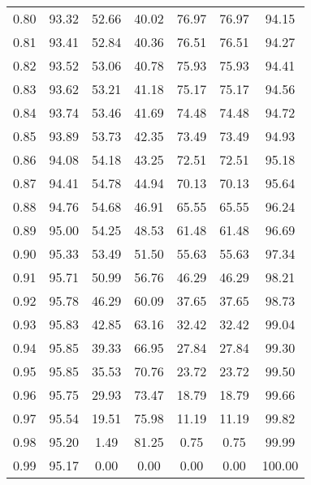 \begin{tabular}{|c|c|c|c|c|c|c|}
      0.80 &     93.32 &     52.66 &      40.02 &   76.97 &      76.97 &         94.15 \\
      0.81 &     93.41 &     52.84 &      40.36 &   76.51 &      76.51 &         94.27 \\
      0.82 &     93.52 &     53.06 &      40.78 &   75.93 &      75.93 &         94.41 \\
      0.83 &     93.62 &     53.21 &      41.18 &   75.17 &      75.17 &         94.56 \\
      0.84 &     93.74 &     53.46 &      41.69 &   74.48 &      74.48 &         94.72 \\
      0.85 &     93.89 &     53.73 &      42.35 &   73.49 &      73.49 &         94.93 \\
      0.86 &     94.08 &     54.18 &      43.25 &   72.51 &      72.51 &         95.18 \\
      0.87 &     94.41 &     54.78 &      44.94 &   70.13 &      70.13 &         95.64 \\
      0.88 &     94.76 &     54.68 &      46.91 &   65.55 &      65.55 &         96.24 \\
      0.89 &     95.00 &     54.25 &      48.53 &   61.48 &      61.48 &         96.69 \\
      0.90 &     95.33 &     53.49 &      51.50 &   55.63 &      55.63 &         97.34 \\
      0.91 &     95.71 &     50.99 &      56.76 &   46.29 &      46.29 &         98.21 \\
      0.92 &     95.78 &     46.29 &      60.09 &   37.65 &      37.65 &         98.73 \\
      0.93 &     95.83 &     42.85 &      63.16 &   32.42 &      32.42 &         99.04 \\
      0.94 &     95.85 &     39.33 &      66.95 &   27.84 &      27.84 &         99.30 \\
      0.95 &     95.85 &     35.53 &      70.76 &   23.72 &      23.72 &         99.50 \\
      0.96 &     95.75 &     29.93 &      73.47 &   18.79 &      18.79 &         99.66 \\
      0.97 &     95.54 &     19.51 &      75.98 &   11.19 &      11.19 &         99.82 \\
      0.98 &     95.20 &      1.49 &      81.25 &    0.75 &       0.75 &         99.99 \\
      0.99 &     95.17 &      0.00 &       0.00 &    0.00 &       0.00 &        100.00 \\
\bottomrule
\end{tabular}
